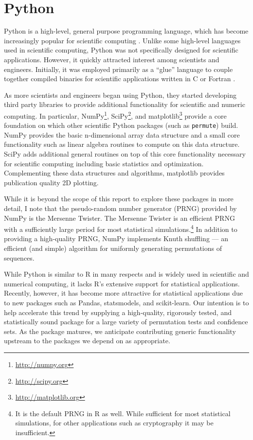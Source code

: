 \section{Python}

Python is a high-level, general purpose programming language, which has become
increasingly popular for scientific computing \cite{millman2011python,
Perez2011}. Unlike some high-level languages used in scientific computing,
Python was not specifically designed for scientific applications.  However, it
quickly attracted interest among scientists and engineers.  Initially, it was
employed primarily as a ``glue'' language to couple together compiled binaries
for scientific applications written in C or Fortran \cite{dubois2007guest}.

As more scientists and engineers began using Python, they started developing
third party libraries to provide additional functionality for scientific and
numeric computing.  In particular, NumPy\footnote{\url{http://numpy.org}},
SciPy\footnote{\url{http://scipy.org}}, and
matplotlib\footnote{\url{http://matplotlib.org}} provide a core foundation on
which other scientific Python packages (such as \texttt{permute}) build. NumPy
provides the basic n-dimensional array data structure and a small core
functionality such as linear algebra routines to compute on this data
structure.  SciPy adds additional general routines on top of this core
functionality necessary for scientific computing including basic statistics and
optimization.  Complementing these data structures and algorithms, matplotlib
provides publication quality 2D plotting.  

While it is beyond the scope of this report to explore these packages in more
detail, I note that the pseudo-random number generator (PRNG) provided by NumPy
is the Mersenne Twister.  The Mersenne Twister is an efficient PRNG with a
sufficiently large period for most statistical simulations.\footnote{It is
the default PRNG in R as well.  While sufficient for most statistical simulations,
for other applications such as cryptography it may be insufficient.}  In
addition to providing a high-quality PRNG, NumPy implements Knuth shuffling ---
an efficient (and simple) algorithm for uniformly generating permutations of
sequences.

While Python is similar to R in many respects and is widely used in scientific
and numerical computing, it lacks R's extensive support for statistical
applications.  Recently, however, it has become more attractive for statistical
applications due to new packages such as Pandas, statsmodels, and
scikit-learn.  Our intention is to help accelerate this trend by supplying a
high-quality, rigorously tested, and statistically sound package for a large
variety of permutation tests and confidence sets. As the package matures, we
anticipate contributing generic functionality upstream to the packages we
depend on as appropriate.

